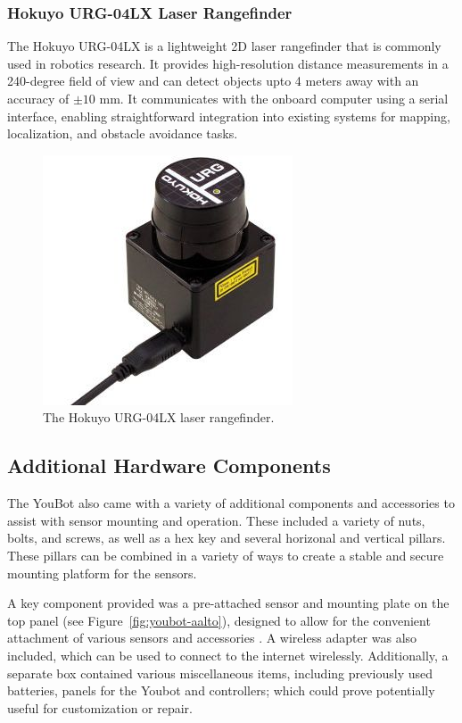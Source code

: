 \documentclass[a4paper, 12pt]{article}
\newif\ifshownotes
\newcommand{\notes}[1]{\ifshownotes\textcolor{blue}{#1}\fi}
\begin{document}
    \subsubsection{Hokuyo URG-04LX Laser Rangefinder}

    The Hokuyo URG-04LX is a lightweight 2D laser rangefinder that is commonly used in robotics research. It provides high-resolution distance measurements in a 240-degree field of view and can detect objects upto 4 meters away with an accuracy of \(\pm10\) mm. It communicates with the onboard computer using a serial interface, enabling straightforward integration into existing systems for mapping, localization, and obstacle avoidance tasks. 

    \begin{figure}[ht]
        \centering
        \includegraphics[width=0.25\linewidth]{images/sec2/hokuyo.png}
        \caption{The Hokuyo URG-04LX laser rangefinder.}
    \end{figure}

    \subsection{Additional Hardware Components}

    The YouBot also came with a variety of additional components and accessories to assist with sensor mounting and operation. These included a variety of nuts, bolts, and screws, as well as a hex key and several horizonal and vertical pillars. These pillars can be combined in a variety of ways to create a stable and secure mounting platform for the sensors. 

    A key component provided was a pre-attached sensor and mounting plate on the top panel (see Figure~\ref{fig:youbot-aalto}), designed to allow for the convenient attachment of various sensors and accessories \notes{[cite https://web.archive.org/web/20160613151621/http://www.youbot-store.com/accessories/mounting-and-sensor-plate]}. A wireless adapter was also included, which can be used to connect to the internet wirelessly. Additionally, a separate box contained various miscellaneous items, including previously used batteries, panels for the Youbot and controllers; which could prove potentially useful for customization or repair.
\end{document}
